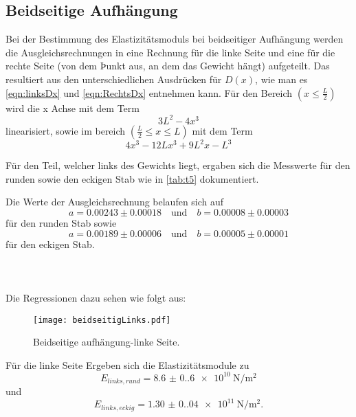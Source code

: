 \subsection{Beidseitige Aufhängung}
Bei der Bestimmung des Elastizitätsmoduls bei beidseitiger Aufhängung werden
die Ausgleichsrechnungen in eine Rechnung für die linke Seite und eine für
die rechte Seite (von dem Þunkt aus, an dem das Gewicht hängt) aufgeteilt.
Das resultiert aus den unterschiedlichen Ausdrücken für $D(x)$, wie man es
\autoref{eqn:linksDx} und \autoref{eqn:RechtsDx} entnehmen kann.
Für den Bereich $(x\leq\frac{L}{2})$ wird die x Achse mit dem Term
\begin{equation*}
    3L^2-4x^3
\end{equation*}
linearisiert, sowie im bereich $(\frac{L}{2}\leq x \leq L)$ mit dem Term
\begin{equation}
  4x^3-12Lx^3+9L^2x-L^3
\end{equation}

\noindent Für den Teil, welcher links des Gewichts liegt, ergaben sich die 
Messwerte für den runden sowie den eckigen Stab wie in \autoref{tab:t5} 
dokumentiert.

\noindent Die Werte der Ausgleichsrechnung belaufen sich auf 
\begin{equation*}
  a = 0.00243 \pm 0.00018 \quad \text{und} \quad b = 0.00008 \pm 0.00003
\end{equation*}
für den runden Stab sowie
\begin{equation*}
  a = 0.00189 \pm 0.00006 \quad \text{und} \quad b = 0.00005 \pm 0.00001
\end{equation*}
für den eckigen Stab.
\\
\\
\\
\\
\noindent Die Regressionen dazu sehen wie folgt aus:
\begin{figure}[H]
  \centering
  \texttt{[image: beidseitigLinks.pdf]}
  \caption{Beidseitige aufhängung-linke Seite.}
  \label{fig:linksBeidseitig}
\end{figure}
Für die linke Seite Ergeben sich die Elastizitätsmodule zu 
\begin{equation*}
  E_{links,rund} = \qty{8.6(0.6)e10}{\newton\per\meter\squared}
\end{equation*}
und
\begin{equation*}
  E_{links,eckig} = \qty{1.30(0.04)e11}{\newton\per\meter\squared}.
\end{equation*}


